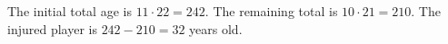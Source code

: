 The initial total age is $11\cdot22=242$. The remaining total is $10\cdot21=210$. The injured player is $242-210=\boxed{32}$ years old.
